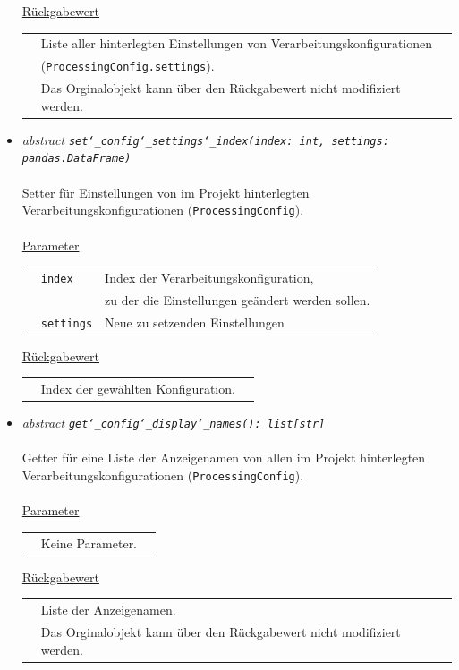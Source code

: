 \documentclass{article}
\begin{document}
\begin{itemize}
\underline{Rückgabewert}\\
\begin{tabular}{lll}
 & Liste aller hinterlegten Einstellungen von Verarbeitungskonfigurationen\\
 & (\texttt{ProcessingConfig.settings}).\\
 & Das Orginalobjekt kann über den Rückgabewert nicht modifiziert werden.\\
\end{tabular}


\item \textit{\flqq{}abstract\frqq} \texttt{\textit{set\char`_config\char`_settings\char`_index(index: int, settings: pandas.DataFrame)}}\\\\
Setter für Einstellungen von im Projekt hinterlegten Verarbeitungskonfigurationen (\texttt{ProcessingConfig}).
\\\\
\underline{Parameter}\\
\begin{tabular}{lll}
 & \texttt{index} & Index der Verarbeitungskonfiguration,\\
 && zu der die Einstellungen geändert werden sollen.\\
 & \texttt{settings} & Neue zu setzenden Einstellungen\\
\end{tabular}

\underline{Rückgabewert}\\
\begin{tabular}{lll}
 & Index der gewählten Konfiguration.\\
\end{tabular}


\item \textit{\flqq{}abstract\frqq} \texttt{\textit{get\char`_config\char`_display\char`_names(): list[str]}}\\\\
Getter für eine Liste der Anzeigenamen von allen im Projekt hinterlegten Verarbeitungskonfigurationen (\texttt{ProcessingConfig}).
\\\\
\underline{Parameter}\\
\begin{tabular}{lll}
 & Keine Parameter.
\end{tabular}

\underline{Rückgabewert}\\
\begin{tabular}{lll}
 & Liste der Anzeigenamen.\\
 & Das Orginalobjekt kann über den Rückgabewert nicht modifiziert werden.\\
\end{tabular}



\end{itemize}
\end{document}
